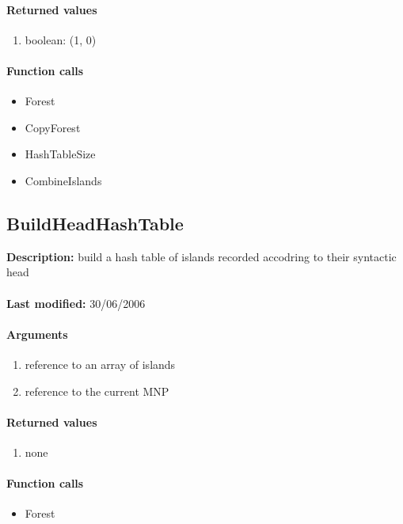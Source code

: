 \paragraph{Returned values}
\begin{enumerate}
\item boolean: (1, 0)
\end{enumerate}

\paragraph{Function calls}
\begin{itemize}
\item Forest
\item CopyForest
\item HashTableSize
\item CombineIslands
\end{itemize}

\subsection{BuildHeadHashTable}
\textbf{Description:} build a hash table of islands recorded accodring to their syntactic head\\
\\\textbf{Last modified:} 30/06/2006

\paragraph{Arguments}
\begin{enumerate}
\item reference to an array of islands
\item reference to the current MNP
\end{enumerate}

\paragraph{Returned values}
\begin{enumerate}
\item none
\end{enumerate}

\paragraph{Function calls}
\begin{itemize}
\item Forest
\end{itemize}

